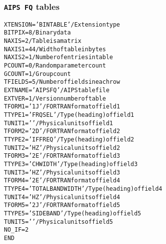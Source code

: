 \documentclass[twoside]{article}
\begin{document}
\subsubsection{{\tt AIPS FQ} tables}
\label{Appe:FQtable}
\small
\begin{alltt}
XTENSION= 'BINTABLE'           / Extension type
BITPIX  =                    8 / Binary data
NAXIS   =                    2 / Table is a matrix
NAXIS1  =                   44 / Width of table in bytes
NAXIS2  =                    1 / Number of entries in table
PCOUNT  =                    0 / Random parameter count
GCOUNT  =                    1 / Group count
TFIELDS =                    5 / Number of fields in each row
EXTNAME = 'AIPS FQ '           / AIPS table file
EXTVER  =                    1 / Version number of table
TFORM1  = '1J      '           / FORTRAN format of field  1
TTYPE1  = 'FRQSEL          '   / Type (heading) of field  1
TUNIT1  = '        '           / Physical units of field  1
TFORM2  = '2D      '           / FORTRAN format of field  2
TTYPE2  = 'IF FREQ         '   / Type (heading) of field  2
TUNIT2  = 'HZ      '           / Physical units of field  2
TFORM3  = '2E      '           / FORTRAN format of field  3
TTYPE3  = 'CH WIDTH        '   / Type (heading) of field  3
TUNIT3  = 'HZ      '           / Physical units of field  3
TFORM4  = '2E      '           / FORTRAN format of field  4
TTYPE4  = 'TOTAL BANDWIDTH '   / Type (heading) of field  4
TUNIT4  = 'HZ      '           / Physical units of field  4
TFORM5  = '2J      '           / FORTRAN format of field  5
TTYPE5  = 'SIDEBAND        '   / Type (heading) of field  5
TUNIT5  = '        '           / Physical units of field  5
NO_IF   =            2
END
\end{alltt}
\end{document}

